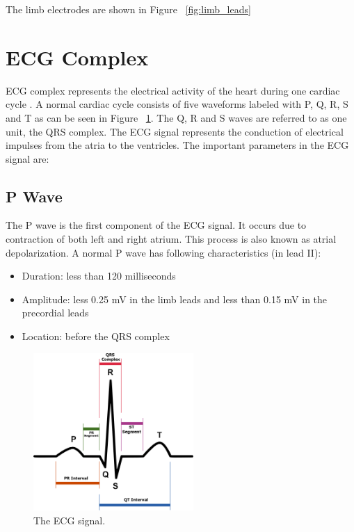 The limb electrodes are shown in Figure ~\ref{fig:limb_leads}


\section{ECG Complex}
ECG complex represents the electrical activity of the heart during one cardiac cycle \cite{wilkins2005ecg}. A normal cardiac cycle consists of five waveforms labeled with P, Q, R, S and T as can be seen in Figure ~\ref{fig:SinusRhythmLabels}. The Q, R and S waves are referred to as one unit, the QRS complex. The ECG signal represents the conduction of electrical impulses from the atria to the ventricles. The important parameters in the ECG signal are:

\subsection{P Wave}

The P wave is the first component of the ECG signal. It occurs due to contraction of both left and right atrium. This process is also known as atrial depolarization. A normal P wave has following characteristics (in lead II):
\begin{itemize}
	\item Duration: less than 120 milliseconds
	\item Amplitude: less 0.25 mV in the limb leads and less than 0.15 mV in the precordial leads
	\item Location: before the QRS complex
\end{itemize}

\begin{figure}[htpb]
	\centering
	\includegraphics[width=\textwidth,height=6cm,keepaspectratio=true]{images/SinusRhythmLabels}
	\caption{
		The ECG signal\cite{wiki:SinusRhythmLabels}.
	}
	\label{fig:SinusRhythmLabels}
\end{figure}

